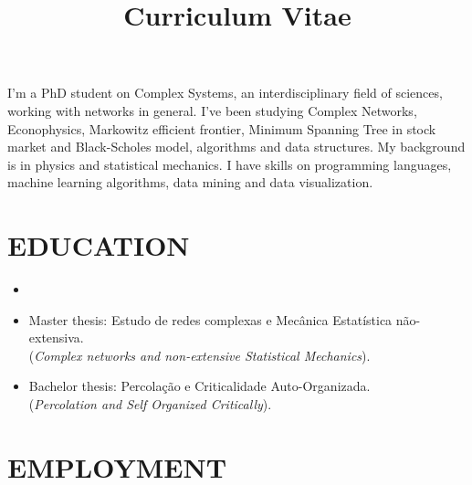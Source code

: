 \documentclass[12pt,a4paper,sans]{moderncv}        %
\title{Curriculum Vitae}                               %
\begin{document}
\makecvtitle

\small{I'm a PhD student on Complex Systems, an interdisciplinary field of sciences, working with networks in general. I've been studying Complex Networks, Econophysics, Markowitz efficient frontier, Minimum Spanning Tree in stock market and Black-Scholes model, algorithms and data structures. My background is in physics and statistical mechanics. I have skills on programming languages, machine learning algorithms, data mining and data visualization.}

\section{EDUCATION}

\vspace{5pt}

\begin{itemize}

\item{}

\item{Master thesis: Estudo de redes complexas e Mecânica Estatística não-extensiva.\\(\textit{Complex networks and non-extensive Statistical Mechanics}).}  %

\item{Bachelor thesis: Percolação e Criticalidade Auto-Organizada.\\(\textit{Percolation and Self Organized Critically}).}  %

\end{itemize}
\section{EMPLOYMENT}
\end{document}
